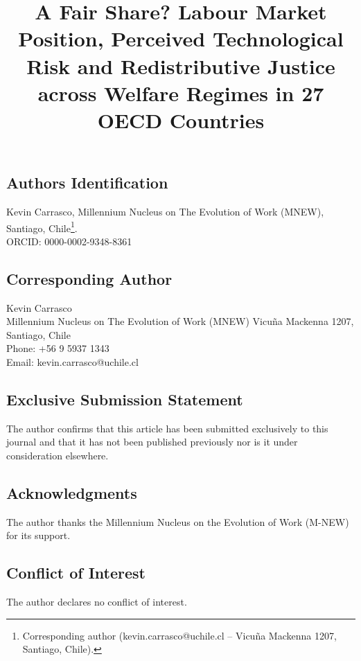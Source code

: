 \documentclass[
  12pt,
  letterpaper,
  DIV=11,
  numbers=noendperiod]{scrartcl}
\title{A Fair Share? Labour Market Position, Perceived Technological
Risk and Redistributive Justice across Welfare Regimes in 27 OECD
Countries}
\author{}
\date{}
\begin{document}
\maketitle


\subsection{Authors Identification}\label{authors-identification}

Kevin Carrasco, Millennium Nucleus on The Evolution of Work (MNEW),
Santiago, Chile\footnote{Corresponding author (kevin.carrasco@uchile.cl
  -- Vicuña Mackenna 1207, Santiago, Chile).}.\\
ORCID: 0000-0002-9348-8361

\subsection{Corresponding Author}\label{corresponding-author}

Kevin Carrasco\\
Millennium Nucleus on The Evolution of Work (MNEW) Vicuña Mackenna 1207,
Santiago, Chile\\
Phone: +56 9 5937 1343\\
Email: kevin.carrasco@uchile.cl

\subsection{Exclusive Submission
Statement}\label{exclusive-submission-statement}

The author confirms that this article has been submitted exclusively to
this journal and that it has not been published previously nor is it
under consideration elsewhere.

\subsection{Acknowledgments}\label{acknowledgments}

The author thanks the Millennium Nucleus on the Evolution of Work
(M-NEW) for its support.

\subsection{Conflict of Interest}\label{conflict-of-interest}

The author declares no conflict of interest.
\end{document}

